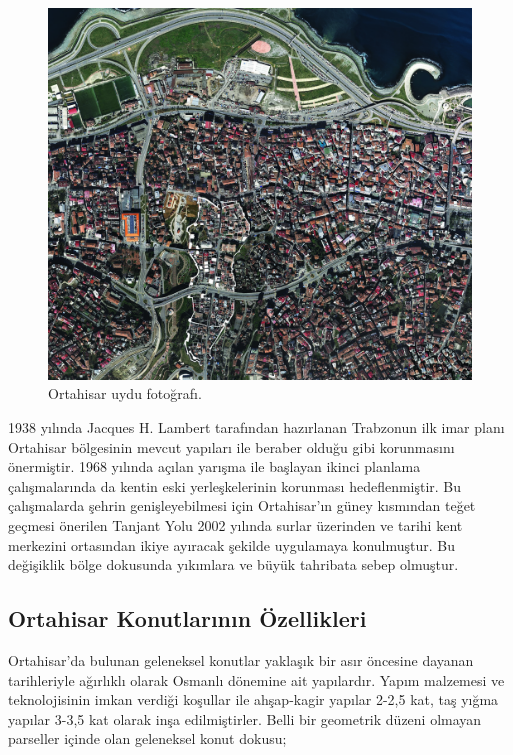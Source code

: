 \documentclass[12pt,turkish,a4paperpaper,]{report}
\begin{document}
\begin{figure}
\centering
\includegraphics[width=1\textwidth,height=\textheight]{source/figures/OrtahisarUyduIzli.jpg}
\caption{Ortahisar uydu fotoğrafı.}
\end{figure}

1938 yılında Jacques H. Lambert tarafından hazırlanan Trabzonun ilk imar
planı Ortahisar bölgesinin mevcut yapıları ile beraber olduğu gibi
korunmasını önermiştir. 1968 yılında açılan yarışma ile başlayan ikinci
planlama çalışmalarında da kentin eski yerleşkelerinin korunması
hedeflenmiştir. Bu çalışmalarda şehrin genişleyebilmesi için
Ortahisar'ın güney kısmından teğet geçmesi önerilen Tanjant Yolu 2002
yılında surlar üzerinden ve tarihi kent merkezini ortasından ikiye
ayıracak şekilde uygulamaya konulmuştur. Bu değişiklik bölge dokusunda
yıkımlara ve büyük tahribata sebep olmuştur.

\hypertarget{ortahisar-konutlarux131nux131n-uxf6zellikleri}{%
\subsection{Ortahisar Konutlarının
Özellikleri}\label{ortahisar-konutlarux131nux131n-uxf6zellikleri}}

Ortahisar'da bulunan geleneksel konutlar yaklaşık bir asır öncesine
dayanan tarihleriyle ağırlıklı olarak Osmanlı dönemine ait yapılardır.
Yapım malzemesi ve teknolojisinin imkan verdiği koşullar ile ahşap-kagir
yapılar 2-2,5 kat, taş yığma yapılar 3-3,5 kat olarak inşa
edilmiştirler. Belli bir geometrik düzeni olmayan parseller içinde olan
geleneksel konut dokusu;
\end{document}
